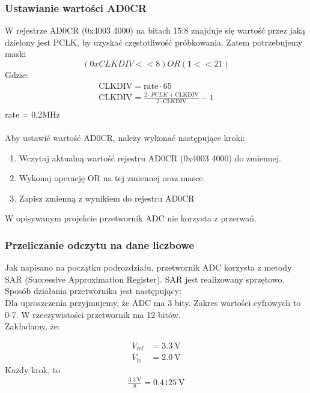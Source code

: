 \subsubsection{Ustawianie wartości AD0CR}
    W rejestrze AD0CR (0x4003 4000) na bitach 15:8 znajduje się wartość przez jaką dzielony jest PCLK, by uzyskać częstotliwość próbkowania.
    Zatem potrzebujemy maski \\
    \[
    (0xCLKDIV<<8) OR (1<<21)
    \]
    Gdzie:\\
    \begin{align*}
        \text{CLKDIV} = \text{rate} \cdot 65 \\
        \text{CLKDIV} = \frac{2 \cdot PCLK  + \text{CLKDIV}}{2 \cdot \text{CLKDIV}} - 1\\
    \end{align*}
    rate = 0,2MHz\\
    \\
    Aby ustawić wartość AD0CR, należy wykonać następujące kroki:
    \begin{enumerate}
        \item Wczytaj aktualną wartość rejestru AD0CR (0x4003 4000) do zmiennej.
        \item Wykonaj operację OR na tej zmiennej oraz masce.
        \item Zapisz zmienną z wynikiem do rejestru AD0CR
    \end{enumerate}
    W opisywanym projekcie przetwornik ADC nie korzysta z przerwań.

    \subsubsection{Przeliczanie odczytu na dane liczbowe}
    Jak napisano na początku podrozdziału, przetwornik ADC korzysta z metody SAR (Successive Approximation Register). SAR jest realizowany sprzętowo. Sposób działania przetwornika jest następujący:\\
    Dla uproszczenia przyjmujemy, że ADC ma 3 bity. Zakres wartości cyfrowych to 0-7. W rzeczywistości przetwornik ma 12 bitów.\\
    Zakładamy, że:

    \begin{align*}
        V_{\text{ref}} &= \SI{3.3}{\volt} \\
        V_{\text{in}} &= \SI{2.0}{\volt}
    \end{align*}
    Każdy krok, to 
    \begin{align*}
        \frac{\SI{3.3}{\volt}}{8} = \SI{0.4125}{\volt}
    \end{align*}

